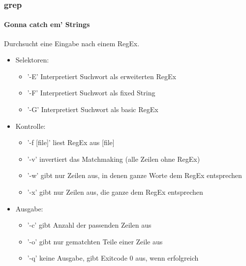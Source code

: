 \documentclass[12pt,utf8]{beamer}
\begin{document}
\begin{frame}
\frametitle{grep}
\framesubtitle{Gonna catch em' Strings}
Durchsucht eine Eingabe nach einem RegEx.
\begin{itemize}[<+->]
	\item Selektoren:
	\begin{itemize}[<+->]
		\item '-E' Interpretiert Suchwort als erweiterten RegEx
		\item '-F' Interpretiert Suchwort als fixed String
		\item '-G' Interpretiert Suchwort als basic RegEx
	\end{itemize}
	\item Kontrolle:
	\begin{itemize}
		\item '-f [file]' liest RegEx aus [file]
		\item '-v' invertiert das Matchmaking (alle Zeilen ohne RegEx)
		\item '-w' gibt nur Zeilen aus, in denen ganze Worte dem RegEx entsprechen
		\item '-x' gibt nur Zeilen aus, die ganze dem RegEx entsprechen
	\end{itemize}
	\item Ausgabe:
	\begin{itemize}
		\item '-c' gibt Anzahl der passenden Zeilen aus
		\item '-o' gibt nur gematchten Teile einer Zeile aus
		\item '-q' keine Ausgabe, gibt Exitcode 0 aus, wenn erfolgreich
	\end{itemize}
\end{itemize}
\end{frame}
\end{document}
